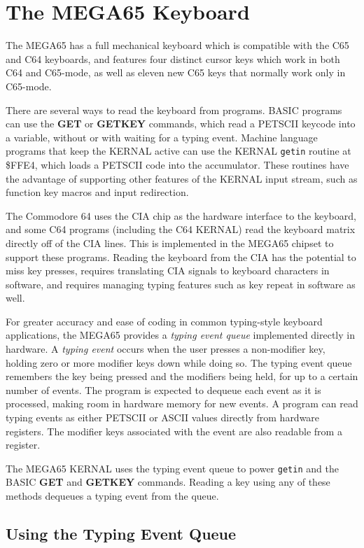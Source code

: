
\chapter{The MEGA65 Keyboard}
\label{cha:keyboard}

The MEGA65 has a full mechanical keyboard which is compatible with the C65 and
C64 keyboards, and features four distinct cursor keys which work in both C64
and C65-mode, as well as eleven new C65 keys that normally work only in
C65-mode.

There are several ways to read the keyboard from programs. BASIC programs can
use the {\bf GET} or {\bf GETKEY} commands, which read a PETSCII keycode into
a variable, without or with waiting for a typing event. Machine language
programs that keep the KERNAL active can use the KERNAL {\tt getin} routine at
\$FFE4, which loads a PETSCII code into the accumulator. These routines have
the advantage of supporting other features of the KERNAL input stream, such as
function key macros and input redirection.

The Commodore 64 uses the CIA chip as the hardware interface to the keyboard,
and some C64 programs (including the C64 KERNAL) read the keyboard matrix
directly off of the CIA lines. This is implemented in the MEGA65 chipset to
support these programs. Reading the keyboard from the CIA has the potential to
miss key presses, requires translating CIA signals to keyboard characters in
software, and requires managing typing features such as key repeat in software
as well.

For greater accuracy and ease of coding in common typing-style keyboard
applications, the MEGA65 provides a {\em typing event queue} implemented
directly in hardware. A {\em typing event} occurs when the user presses a
non-modifier key, holding zero or more modifier keys down while doing so. The
typing event queue remembers the key being pressed and the modifiers being
held, for up to a certain number of events. The program is expected to dequeue
each event as it is processed, making room in hardware memory for new events.
A program can read typing events as either PETSCII or ASCII values directly
from hardware registers. The modifier keys associated with the event are also
readable from a register.

The MEGA65 KERNAL uses the typing event queue to power {\tt getin} and the
BASIC {\bf GET} and {\bf GETKEY} commands. Reading a key using any of these
methods dequeues a typing event from the queue.

\section{Using the Typing Event Queue}

